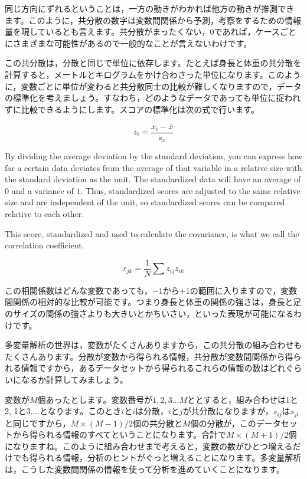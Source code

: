\documentclass{ltjsbook}
\begin{document}
同じ方向にずれるということは，一方の動きがわかれば他方の動きが推測できます。このように，共分散の数字は変数間関係から予測，考察をするための情報量を現しているとも言えます。共分散がまったくない，0であれば，ケースごとにさまざまな可能性があるので一般的なことが言えないわけです。

この共分散は，分散と同じで単位に依存します。たとえば身長と体重の共分散を計算すると，メートルとキログラムをかけ合わさった単位になります。このように，変数ごとに単位が変わると共分散同士の比較が難しくなりますので，データの標準化を考えましょう。すなわち，どのようなデータであっても単位に捉われずに比較できるようにします。スコアの標準化は次の式で行います。

\[ z_i = \frac{x_i - \bar{x}}{s_x} \]

By dividing the average deviation by the standard deviation, you can express how far a certain data deviates from the average of that variable in a relative size with the standard deviation as the unit. The standardized data will have an average of $0$ and a variance of $1$. Thus, standardized scores are adjusted to the same relative size and are independent of the unit, so standardized scores can be compared relative to each other.

This score, standardized and used to calculate the covariance, is what we call the correlation coefficient.

\[ r_{jk} = \frac{1}{N} \sum z_{ij} z_{ik} \]

この相関係数はどんな変数であっても，$-1$から$+1$の範囲に入りますので，変数間関係の相対的な比較が可能です。つまり身長と体重の関係の強さは，身長と足のサイズの関係の強さよりも大きいとかちいさい，といった表現が可能になるわけです。

多変量解析の世界は，変数がたくさんありますから，この共分散の組み合わせもたくさんあります。分散が変数から得られる情報，共分散が変数間関係から得られる情報ですから，あるデータセットから得られるこれらの情報の数はどれぐらいになるか計算してみましょう。

変数が$M$個あったとします。変数番号が$1,2,3...M$ととすると，組み合わせは1と2, 1と3....となります。このとき$i$と$i$は分散，$i$と$j$が共分散になりますが，$s_{ij}$は$s_{ji}$と同じですから，$M \times (M-1) /2$個の共分散と$M$個の分散が，このデータセットから得られる情報のすべてということになります。合計で$M \times (M+1) /2 $個になりますね。このように組み合わせまで考えると，変数の数がひとつ増えるだけでも得られる情報，分析のヒントがぐっと増えることになります。多変量解析は，こうした変数間関係の情報を使って分析を進めていくことになります。
\end{document}
